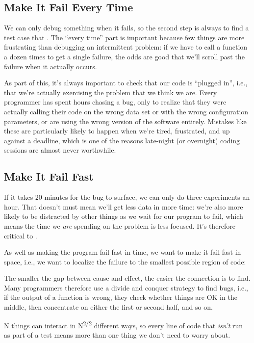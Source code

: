 \subsection*{Make It Fail Every Time}

We can only debug something when it fails, so the second step is always
to find a test case that
. The ``every time'' part is important because few things are more
frustrating than debugging an intermittent problem: if we have to call a
function a dozen times to get a single failure, the odds are good that
we'll scroll past the failure when it actually occurs.

As part of this, it's always important to check that our code is
``plugged in'', i.e., that we're actually exercising the problem that we
think we are. Every programmer has spent hours chasing a bug, only to
realize that they were actually calling their code on the wrong data set
or with the wrong configuration parameters, or are using the wrong
version of the software entirely. Mistakes like these are particularly
likely to happen when we're tired, frustrated, and up against a
deadline, which is one of the reasons late-night (or overnight) coding
sessions are almost never worthwhile.

\subsection*{Make It Fail Fast}

If it takes 20 minutes for the bug to surface, we can only do three
experiments an hour. That doesn't must mean we'll get less data in more
time: we're also more likely to be distracted by other things as we wait
for our program to fail, which means the time we \emph{are} spending on
the problem is less focused. It's therefore critical to
.

As well as making the program fail fast in time, we want to make it fail
fast in space, i.e., we want to localize the failure to the smallest
possible region of code:

\begin{swcenumerate}
\item
  The smaller the gap between cause and effect, the easier the
  connection is to find. Many programmers therefore use a divide and
  conquer strategy to find bugs, i.e., if the output of a function is
  wrong, they check whether things are OK in the middle, then
  concentrate on either the first or second half, and so on.
\item
  N things can interact in N\textsuperscript{2/2} different ways, so
  every line of code that \emph{isn't} run as part of a test means more
  than one thing we don't need to worry about.
\end{swcenumerate}

